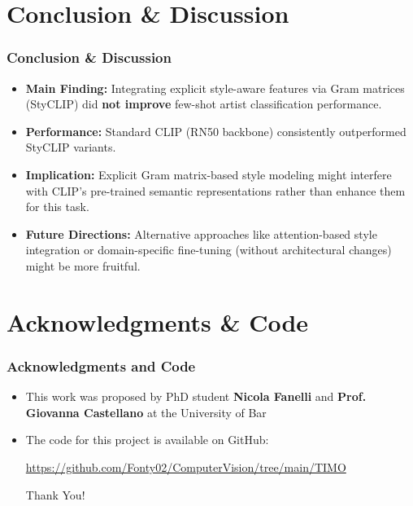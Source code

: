 \documentclass[aspectratio=169,xcolor=dvipsnames]{beamer}
\begin{document}
\section{Conclusion \& Discussion}
\begin{frame}
  \frametitle{Conclusion \& Discussion}
  \begin{itemize}
    \item \textbf{Main Finding:} Integrating explicit style-aware features via Gram matrices (StyCLIP) did \textbf{not improve} few-shot artist classification performance.
    \item \textbf{Performance:} Standard CLIP (RN50 backbone) consistently outperformed StyCLIP variants.
    \item \textbf{Implication:} Explicit Gram matrix-based style modeling might interfere with CLIP's pre-trained semantic representations rather than enhance them for this task.
    \item \textbf{Future Directions:} Alternative approaches like attention-based style integration or domain-specific fine-tuning (without architectural changes) might be more fruitful.
  \end{itemize}
\end{frame}

\section{Acknowledgments \& Code}
\begin{frame}
  \frametitle{Acknowledgments and Code}
  \begin{itemize}
    \item This work was proposed by PhD student \textbf{Nicola Fanelli} and \textbf{Prof. Giovanna Castellano} at the University of Bar
  \item The code for this project is available on GitHub:
  \begin{center}
    \url{https://github.com/Fonty02/ComputerVision/tree/main/TIMO}
  \end{center}
  \vspace{2em} %
  \begin{center}
    \Large Thank You! 
  \end{center}
    \end{itemize}
\end{frame}

\appendix
\end{document}

